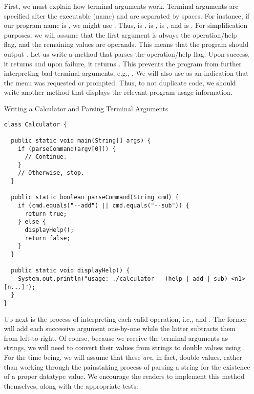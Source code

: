 First, we must explain how terminal arguments work. Terminal arguments are specified after the executable (name) and are separated by spaces. For instance, if our program name is , we might use . Thus,  is ,  is ,  is , and  is . For simplification purposes, we will assume that the first argument is always the operation/help flag, and the remaining values are operands. This means that the program should output . Let us write a method that parses the operation/help flag. Upon success, it returns  and upon failure, it returns . This prevents the program from further interpreting bad terminal arguments, e.g., . We will also use  as an indication that the  menu was requested or prompted. Thus, to not duplicate code, we should write another method that displays the relevant program usage information.

\begin{cl}{Writing a Calculator and Parsing Terminal Arguments}
\begin{lstlisting}[language=MyJava]
class Calculator {

  public static void main(String[] args) {
    if (parseCommand(argv[0])) {
      // Continue.
    }
    // Otherwise, stop.
  }

  public static boolean parseCommand(String cmd) {
    if (cmd.equals("--add") || cmd.equals("--sub")) {
      return true;
    } else {
      displayHelp();
      return false;
    }
  }

  public static void displayHelp() {
    System.out.println("usage: ./calculator --(help | add | sub) <n1> [n...]");
  }
}
\end{lstlisting}
\end{cl}

Up next is the process of interpreting each valid operation, i.e.,  and . The former will add each successive argument one-by-one while the latter subtracts them from left-to-right. Of course, because we receive the terminal arguments as strings, we will need to convert their values from strings to double values using . For the time being, we will assume that these \textit{are}, in fact, double values, rather than working through the painstaking process of parsing a string for the existence of a proper  datatype value. We encourage the readers to implement this method themselves, along with the appropriate tests.

